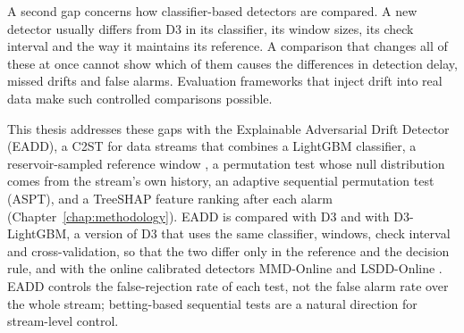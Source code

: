A second gap concerns how classifier-based detectors are compared. A new detector usually differs from D3 in its classifier, its window sizes, its check interval and the way it maintains its reference. A comparison that changes all of these at once cannot show which of them causes the differences in detection delay, missed drifts and false alarms. Evaluation frameworks that inject drift into real data \citep{CerqueiraKDD2026} make such controlled comparisons possible.

This thesis addresses these gaps with the Explainable Adversarial Drift Detector (EADD), a C2ST for data streams that combines a LightGBM classifier, a reservoir-sampled reference window \citep{Vitter1985}, a permutation test whose null distribution comes from the stream's own history, an adaptive sequential permutation test (ASPT), and a TreeSHAP feature ranking after each alarm (Chapter~\ref{chap:methodology}). EADD is compared with D3 and with D3-LightGBM, a version of D3 that uses the same classifier, windows, check interval and cross-validation, so that the two differ only in the reference and the decision rule, and with the online calibrated detectors MMD-Online and LSDD-Online \citep{CobbSequential2022}. EADD controls the false-rejection rate of each test, not the false alarm rate over the whole stream; betting-based sequential tests \citep{PodkopaevRamdas2023} are a natural direction for stream-level control.
